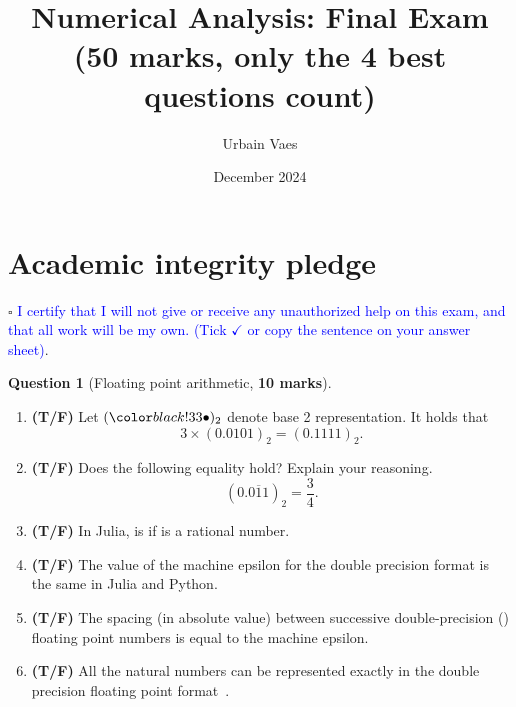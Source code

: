 \documentclass[10pt]{article}
\theoremstyle{definition}
\newtheorem{question}{Question}
\theoremstyle{remark}
\theoremstyle{plain}%
\begin{document}
\title{Numerical Analysis: Final Exam \\
\small{(\textbf{50 marks}, only the 4 best questions count)}}
\author{Urbain Vaes}
\date{December 2024}
\maketitle

\section*{Academic integrity pledge}
\noindent $\square$ \textcolor{blue}{I certify that I will not give or receive any unauthorized help on this exam,
and that all work will be my own. (Tick $\checkmark$ or copy the sentence on your answer sheet)}.


\newpage
\begin{question}
    [Floating point arithmetic, \textbf{10 marks}]
    $~$
    \begin{enumerate}
        \item
            \textbf{(T/F)}
            Let $(\placeholder)_2$ denote base 2 representation.
            It holds that
            \[
                3 \times (0.0101)_2 = (0.1111)_2.
            \]

        \item
            \textbf{(T/F)}
            Does the following equality hold? Explain your reasoning.
            \[
                (0.\overline{011})_2 = \frac{3}{4}.
            \]
             \vspace{1.7cm}

        \item
            \textbf{(T/F)}
            In Julia,  is  if  is a rational number.

        \item
            \textbf{(T/F)}
            The value of the machine epsilon for the double precision format is the same in Julia and Python.

        \item
            \textbf{(T/F)}
            The spacing (in absolute value) between successive double-precision () floating point numbers is equal to the machine epsilon.

        \item
            \textbf{(T/F)}
            All the natural numbers can be represented exactly in the double precision floating point format~.


\end{enumerate}
\end{question}
\end{document}
